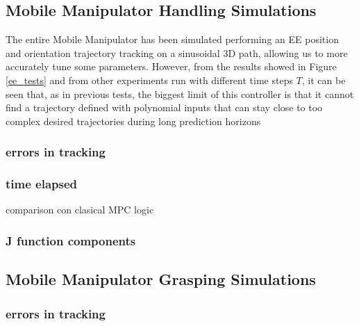 \subsection{Mobile Manipulator Handling Simulations}
The entire Mobile Manipulator has been simulated performing an EE position and orientation trajectory tracking on a sinusoidal 3D path, allowing us to more accurately tune some parameters. 
However, from the results showed in Figure \ref{ee_tests} and from other experiments run with different time steps $T$, it can be seen that, as in previous tests, the biggest limit of this controller is that it cannot find a trajectory defined with polynomial inputs that can stay close to too complex desired trajectories during long prediction horizons

	\subsubsection{errors in tracking}
		
	\subsubsection{time elapsed}
		comparison con clasical MPC logic
	\subsubsection{J function components}

\subsection{Mobile Manipulator Grasping Simulations}

	\subsubsection{errors in tracking}
		
